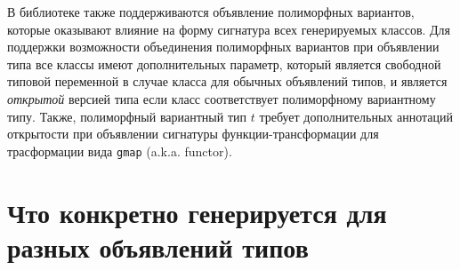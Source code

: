 \documentclass[acmsmall,review,anonymous]{acmart}\settopmatter{printfolios=true,printccs=false,printacmref=false}
\begin{document}
В библиотеке также поддерживаются объявление полиморфных вариантов, которые оказывают влияние на форму сигнатура всех генерируемых классов.
Для поддержки возможности объединения полиморфных вариантов при объявлении типа все классы имеют дополнительных параметр, который 
является свободной типовой переменной в случае класса для обычных объявлений типов, и является \textit{открытой} версией типа если класс 
соответствует полиморфному вариантному типу. Также, полиморфный вариантный тип $t$ требует дополнительных аннотаций открытости при объявлении
сигнатуры функции-трансформации для трасформации вида \verb=gmap= (a.k.a. functor).

\section{Что конкретно генерируется для разных объявлений типов}
\end{document}
